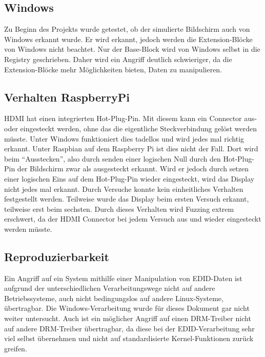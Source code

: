 \subsection{Windows}
Zu Beginn des Projekts wurde getestet, ob der simulierte Bildschirm auch von Windows erkannt wurde. Er wird erkannt, jedoch werden die Extension-Blöcke von Windows nicht beachtet. Nur der Base-Block wird von Windows selbst in die Registry geschrieben. Daher wird ein Angriff deutlich schwieriger, da die Extension-Blöcke mehr Möglichkeiten bieten, Daten zu manipulieren.

\subsection{Verhalten RaspberryPi}	HDMI hat einen integrierten Hot-Plug-Pin. Mit diesem kann ein Connector aus- oder eingesteckt werden, ohne das die eigentliche Steckverbindung gelöst werden müsste.
Unter Windows funktioniert dies tadellos und wird jedes mal richtig erkannt.
Unter Raspbian auf dem Raspberry Pi ist dies nicht der Fall. Dort wird beim ``Ausstecken'', also durch senden einer logischen Null durch den Hot-Plug-Pin der Bildschirm zwar als ausgesteckt erkannt. Wird er jedoch durch setzen einer logischen Eins auf dem Hot-Plug-Pin wieder eingesteckt, wird das Display nicht jedes mal erkannt. 
Durch Versuche konnte kein einheitliches Verhalten festgestellt werden. Teilweise wurde das Display beim ersten Versuch erkannt, teilweise erst beim sechsten.
Durch dieses Verhalten wird Fuzzing extrem erschwert, da der HDMI Connector bei jedem Versuch aus und wieder eingesteckt werden müsste.


\subsection{Reproduzierbarkeit}
Ein Angriff auf ein System mithilfe einer Manipulation von EDID-Daten ist aufgrund der unterschiedlichen Verarbeitungswege nicht auf andere Betriebssysteme, auch nicht bedingungslos auf andere Linux-Systeme, übertragbar. Die Windows-Verarbeitung wurde für dieses Dokument gar nicht weiter untersucht.
Auch ist ein möglicher Angriff auf einen DRM-Treiber nicht auf andere DRM-Treiber übertragbar, da diese bei der EDID-Verarbeitung sehr viel selbst übernehmen und nicht auf standardisierte Kernel-Funktionen zurück greifen. 
